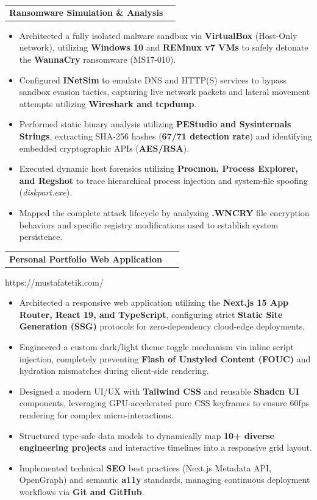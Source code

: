 \documentclass[letterpaper,11pt]{article}
\newcommand{\resumeItem}[1]{
  \item\small{
    {#1 \vspace{-4pt}}
  }
}
\newcommand{\resumeProjectHeading}[2]{
    \item
    \begin{tabularx}{0.97\textwidth}{X r}
      \textbf{#1} & #2 \\
    \end{tabularx}\vspace{-5pt}
}
\newcommand{\resumeItemListStart}{\begin{itemize}}
\newcommand{\resumeItemListEnd}{\end{itemize}\vspace{-5pt}}
\begin{document}
        \resumeProjectHeading
          {\textbf{Ransomware Simulation \& Analysis} }{}
          \resumeItemListStart
            \resumeItem{Architected a fully isolated malware sandbox via \textbf{VirtualBox} (Host-Only network), utilizing \textbf{Windows 10} and \textbf{REMnux v7 VMs} to safely detonate the \textbf{WannaCry} ransomware (MS17-010).}
            \resumeItem{Configured \textbf{INetSim} to emulate DNS and HTTP(S) services to bypass sandbox evasion tactics, capturing live network packets and lateral movement attempts utilizing \textbf{Wireshark and tcpdump}.}
            \resumeItem{Performed static binary analysis utilizing \textbf{PEStudio and Sysinternals Strings}, extracting SHA-256 hashes (\textbf{67/71 detection rate}) and identifying embedded cryptographic APIs (\textbf{AES/RSA}).}
            \resumeItem{Executed dynamic host forensics utilizing \textbf{Procmon, Process Explorer, and Regshot} to trace hierarchical process injection and system-file spoofing (\textit{diskpart.exe}).}
            \resumeItem{Mapped the complete attack lifecycle by analyzing \textbf{.WNCRY} file encryption behaviors and specific registry modifications used to establish system persistence.}
          \resumeItemListEnd

          \resumeProjectHeading
          {\textbf{Personal Portfolio Web Application} \vspace{5px} } \ \vspace{-5px}
          {https://mustafatetik.com/}
          \resumeItemListStart
            \resumeItem{Architected a responsive web application utilizing the \textbf{Next.js 15 App Router, React 19, and TypeScript}, configuring strict \textbf{Static Site Generation (SSG)} protocols for zero-dependency cloud-edge deployments.}
            \resumeItem{Engineered a custom dark/light theme toggle mechanism via inline script injection, completely preventing \textbf{Flash of Unstyled Content (FOUC)} and hydration mismatches during client-side rendering.}
            \resumeItem{Designed a modern UI/UX with \textbf{Tailwind CSS} and reusable \textbf{Shadcn UI} components, leveraging GPU-accelerated pure CSS keyframes to ensure 60fps rendering for complex micro-interactions.}
            \resumeItem{Structured type-safe data models to dynamically map \textbf{10+ diverse engineering projects} and interactive timelines into a responsive grid layout.}
            \resumeItem{Implemented technical \textbf{SEO} best practices (Next.js Metadata API, OpenGraph) and semantic \textbf{a11y} standards, managing continuous deployment workflows via \textbf{Git and GitHub}.}
          \resumeItemListEnd
\end{document}
